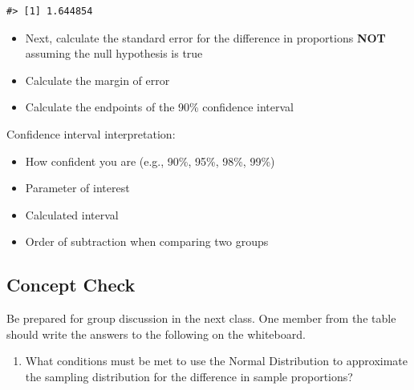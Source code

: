 \documentclass[
]{report}
\providecommand{\tightlist}{%
  \setlength{\itemsep}{0pt}\setlength{\parskip}{0pt}}
\begin{document}
\begin{verbatim}
#> [1] 1.644854
\end{verbatim}

\begin{itemize}
\tightlist
\item
  Next, calculate the standard error for the difference in proportions \textbf{NOT} assuming the null hypothesis is true
\end{itemize}

\vspace{0.8in}

\begin{itemize}
\tightlist
\item
  Calculate the margin of error
\end{itemize}

\vspace{0.6in}

\begin{itemize}
\tightlist
\item
  Calculate the endpoints of the 90\% confidence interval
\end{itemize}

\vspace{0.6in}

Confidence interval interpretation:

\begin{itemize}
\item
  How confident you are (e.g., 90\%, 95\%, 98\%, 99\%)
\item
  Parameter of interest
\item
  Calculated interval
\item
  Order of subtraction when comparing two groups
\end{itemize}

\vspace{0.8in}

\subsection{Concept Check}\label{concept-check-2}

Be prepared for group discussion in the next class. One member from the table should write the answers to the following on the whiteboard.

\begin{enumerate}
\def\labelenumi{\arabic{enumi}.}
\tightlist
\item
  What conditions must be met to use the Normal Distribution to approximate the sampling distribution for the difference in sample proportions?
\end{enumerate}
\end{document}
